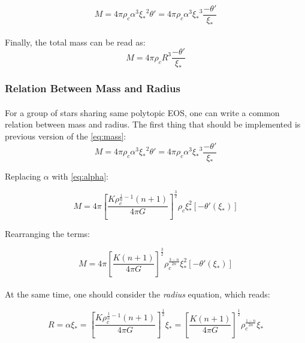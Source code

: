 \documentclass[letterpaper,12pt]{article}
\begin{document}
\begin{equation*}
    M = 4 \pi \rho_c \alpha^3 {\xi_*}^2 \theta' = 4 \pi \rho_c \alpha^3 {\xi_*}^3 \frac{-\theta'}{{\xi_*}}
\end{equation*}
\paragraph{} Finally, the total mass can be read as:
\begin{equation}
    \label{eq:mass}
\boxed{ M = 4 \pi \rho_c R^3 \frac{-\theta'}{{\xi_*}}}
\end{equation}


\subsubsection{Relation Between Mass and Radius}

\paragraph{} For a group of stars sharing same polytopic EOS, one can write a common relation between mass and radius. The first thing that should be implemented is previous version of the \eqref{eq:mass}:
\begin{equation*}
    M = 4 \pi \rho_c \alpha^3 {\xi_*}^2 \theta' = 4 \pi \rho_c \alpha^3 {\xi_*}^3 \frac{-\theta'}{{\xi_*}}
\end{equation*}

Replacing $\alpha$ with \eqref{eq:alpha}:

\begin{equation*}
    M = 4 \pi \left[\frac{K \rho_c^{\frac{1}{n}-1}\left(n+1\right)}{4 \pi G}\right]^{\frac{3}{2}} \rho_c \xi_*^2 \left[-\theta'(\xi_*)\right]
\end{equation*}

Rearranging the terms:

\begin{equation}
    \label{eq:mass2}
    M = 4 \pi \left[\frac{K\left(n+1\right)}{4 \pi G}\right]^{\frac{3}{2}} \rho_c^{\frac{3-n}{2n}} \xi_*^2 \left[-\theta'(\xi_*)\right]
\end{equation}

\paragraph{} At the same time, one should consider the \textit{radius} equation, which reads:

\begin{equation}
    \label{eq:radius}
    R = \alpha \xi_* = \left[\frac{K \rho_c^{\frac{1}{n}-1}\left(n+1\right)}{4 \pi G}\right]^{\frac{1}{2}}\xi_* = \left[\frac{K \left(n+1\right)}{4 \pi G}\right]^{\frac{1}{2}} \rho_c^{\frac{1-n}{2n}} \xi_*
\end{equation}
\end{document}
